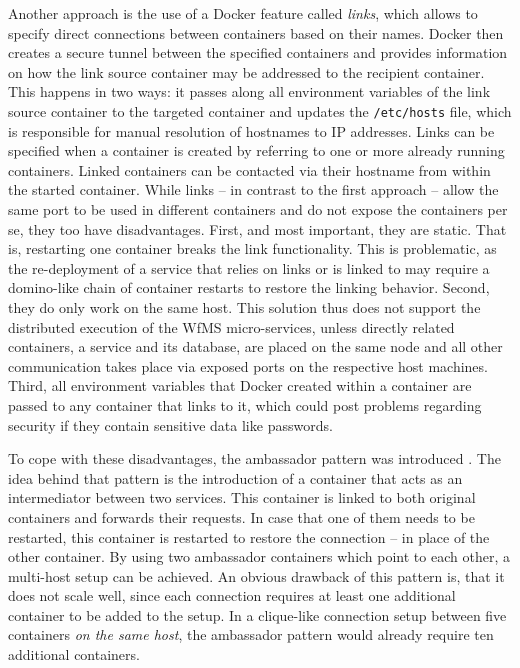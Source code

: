   Another approach is the use of a Docker feature called \emph{links}, which allows to specify direct connections between containers based on their names.
  Docker then creates a secure tunnel between the specified containers and provides information on how the link source container may be addressed to the recipient container. This happens in two ways: it passes along all environment variables of the link source container to the targeted container and updates the \texttt{/etc/hosts} file, which is responsible for manual resolution of hostnames to \ac{IP} addresses.
  Links can be specified when a container is created by referring to one or more already running containers.
  Linked containers can be contacted via their hostname from within the started container.
  While links -- in contrast to the first approach -- allow the same port to be used in different containers and do not expose the containers per se, they too have disadvantages.
  First, and most important, they are static. That is, restarting one container breaks the link functionality. This is problematic, as the re-deployment of a service that relies on links or is linked to may require a domino-like chain of container restarts to restore the linking behavior.
  Second, they do only work on the same host. This solution thus does not support the distributed execution of the \ac{WfMS} micro-services, unless directly related containers, \eg a service and its database, are placed on the same node and all other communication takes place via exposed ports on the respective host machines.
  Third, \ac{all} environment variables that Docker created within a container are passed to any container that links to it, which could post problems regarding security if they contain sensitive data like passwords.

  To cope with these disadvantages, the ambassador pattern was introduced \cite{Docker2016Docker}. The idea behind that pattern is the introduction of a container that acts as an intermediator between two services. This container is linked to both original containers and forwards their requests. In case that one of them needs to be restarted, this container is restarted to restore the connection -- in place of the other container.
  By using two ambassador containers which point to each other, a multi-host setup can be achieved.
  An obvious drawback of this pattern is, that it does not scale well, since each connection requires at least one additional container to be added to the setup. In a clique-like connection setup between five containers \emph{on the same host}, the ambassador pattern would already require ten additional containers.

